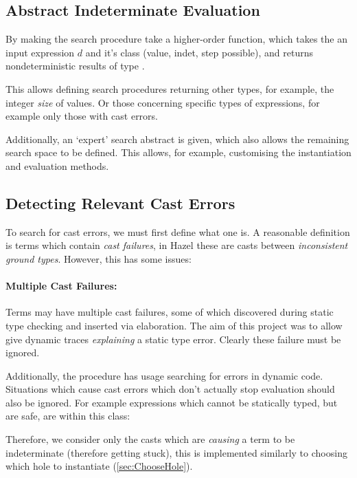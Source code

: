 \subsection{Abstract Indeterminate Evaluation}
\label{sec:AbstractSearch}
By making the search procedure take a higher-order  function, which takes the an input expression $d$ and it's class (value, indet, step possible), and returns nondeterministic results of type .

This allows defining search procedures returning other types, for example, the integer \textit{size} of values. Or those concerning specific types of expressions, for example only those with cast errors. 

Additionally, an `expert' search abstract is given, which also allows the remaining search space to be defined. This allows, for example, customising the instantiation and evaluation methods.

\subsection{Detecting Relevant Cast Errors}
\label{sec:CastFailureDetection}
To search for cast errors, we must first define what one is. A reasonable definition is terms which contain \textit{cast failures}, in Hazel these are casts between \textit{inconsistent ground types}. However, this has some issues:

\paragraph{Multiple Cast Failures:} Terms may have multiple cast failures, some of which discovered during static type checking and inserted via elaboration. The aim of this project was to allow give dynamic traces \textit{explaining} a static type error. Clearly these failure must be ignored.

Additionally, the procedure has usage searching for errors in dynamic code. Situations which cause cast errors which don't actually stop evaluation should also be ignored. For example expressions which cannot be statically typed, but are safe, are within this class: 

Therefore, we consider only the casts which are \textit{causing} a term to be indeterminate (therefore getting stuck), this is implemented similarly to choosing which hole to instantiate (\cref{sec:ChooseHole}).

